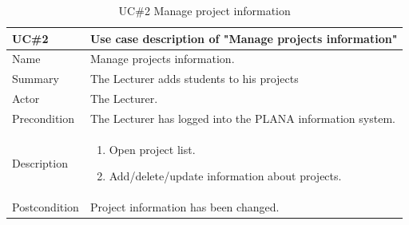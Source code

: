 \documentclass{scrartcl}
\begin{document}
\begin{table}[H]
\begin{center}
\begin{tabular}{| p{2.5cm}| p{12.5cm} |}
\hline
\textbf{UC\#2 } & \textbf{Use case description of "Manage projects information" } \\
\hline
Name  & Manage projects information.\\ \hline
	         Summary  & The Lecturer adds students to his projects \\ \hline
	         Actor   & The Lecturer. \\ \hline
	         Precondition & The Lecturer has logged into the PLANA information system. \\ \hline
	         Description & 
	         \begin{enumerate}
	   		\item Open project list.
			\item Add/delete/update information about projects.
			
			\end{enumerate}
	             \\ \hline	        
	          Postcondition &   Project information has been changed. \\ \hline
	           
\end{tabular}
\end{center}
\caption{UC\#2  Manage  project information}
\label{table2}
\end{table}
  	
\end{document}
